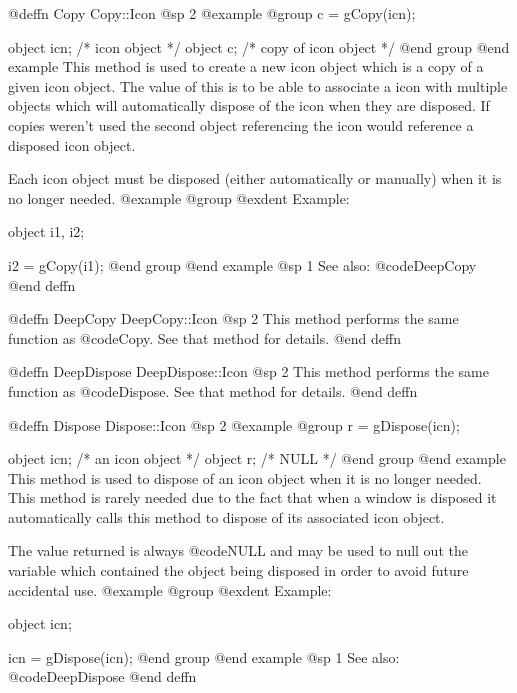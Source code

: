 @deffn {Copy} Copy::Icon
@sp 2
@example
@group
c = gCopy(icn);

object  icn;    /*  icon object          */
object  c;      /*  copy of icon object  */
@end group
@end example
This method is used to create a new icon object which is a copy of a
given icon object.  The value of this is to be able to associate a
icon with multiple objects which will automatically dispose of the
icon when they are disposed.  If copies weren't used the second object
referencing the icon would reference a disposed icon object.

Each icon object must be disposed (either automatically or manually)
when it is no longer needed.
@example
@group
@exdent Example:

object  i1, i2;

i2 = gCopy(i1);
@end group
@end example
@sp 1
See also:  @code{DeepCopy}
@end deffn










@deffn {DeepCopy} DeepCopy::Icon
@sp 2
This method performs the same function as @code{Copy}.  See that
method for details.
@end deffn










@deffn {DeepDispose} DeepDispose::Icon
@sp 2
This method performs the same function as @code{Dispose}.  See that
method for details.
@end deffn







@deffn {Dispose} Dispose::Icon
@sp 2
@example
@group
r = gDispose(icn);

object  icn;   /*  an icon object  */
object  r;     /*  NULL            */
@end group
@end example
This method is used to dispose of an icon object when it is no longer
needed.  This method is rarely needed due to the fact that when a window
is disposed it automatically calls this method to dispose of its
associated icon object.

The value returned is always @code{NULL} and may be used to null out
the variable which contained the object being disposed in order to
avoid future accidental use.
@example
@group
@exdent Example:

object  icn;

icn = gDispose(icn);
@end group
@end example
@sp 1
See also:  @code{DeepDispose}
@end deffn










